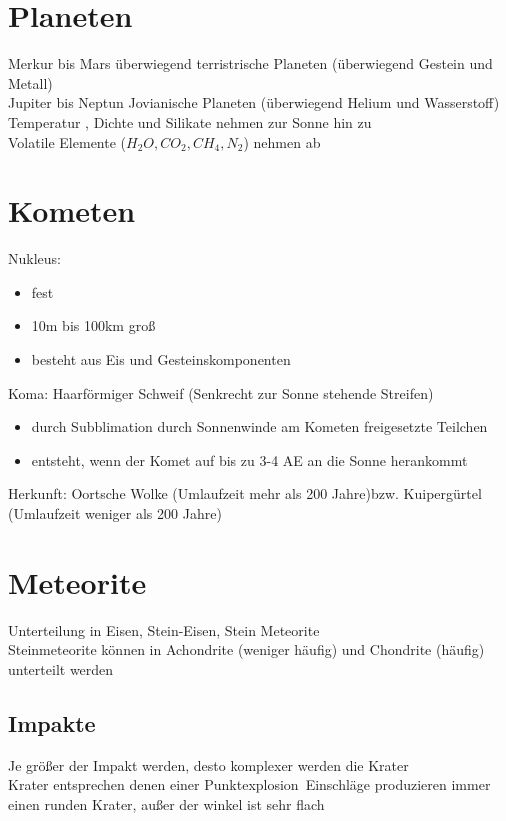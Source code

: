 \documentclass[a4,12pt]{scrreprt}
\begin{document}
\section{Planeten} \label{sec:Planeten}
Merkur bis Mars überwiegend terristrische Planeten (überwiegend Gestein und Metall)\\
Jupiter bis Neptun Jovianische Planeten (überwiegend Helium und Wasserstoff)\\
Temperatur , Dichte und Silikate nehmen zur Sonne hin zu\\
Volatile Elemente ($H_2O,CO_2, CH_4,N_2$) nehmen ab\\

\section{Kometen}
Nukleus:\\

\begin{itemize}
\item fest
\item 10m bis 100km groß
\item besteht aus Eis und Gesteinskomponenten
\end{itemize}


Koma: Haarförmiger Schweif (Senkrecht zur Sonne stehende Streifen)
\begin{itemize}
\item durch Subblimation durch Sonnenwinde am Kometen freigesetzte Teilchen
\item entsteht, wenn der Komet auf bis zu 3-4 AE an die Sonne herankommt
\end{itemize}
Herkunft: Oortsche Wolke (Umlaufzeit  mehr als 200 Jahre)bzw. Kuipergürtel (Umlaufzeit weniger als 200 Jahre)

\section{Meteorite} \label{Meteorite}
Unterteilung in Eisen, Stein-Eisen, Stein Meteorite\\
Steinmeteorite können in Achondrite (weniger häufig) und Chondrite (häufig) unterteilt werden 

\subsection{Impakte} \label{Impakte}
Je größer der Impakt werden, desto komplexer werden die Krater	\\
Krater entsprechen denen einer Punktexplosion\
Einschläge produzieren immer einen runden Krater, außer der winkel ist sehr flach
\end{document}
